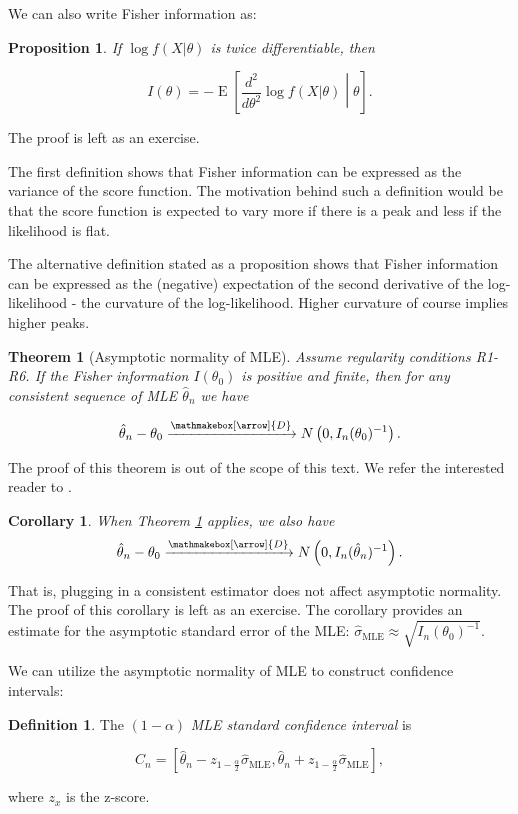 \documentclass{book}
\theoremstyle{plain}%
\newtheorem{theorem}{Theorem}[section]
\newtheorem{corollary}{Corollary}[section]
\newtheorem{proposition}{Proposition}[section]
\theoremstyle{definition}
\newtheorem{definition}{Definition}[section]
\DeclareMathOperator{\E}{E}
\newlength{\arrow}
\newcommand*{\myrightarrow}[1]{\xrightarrow{\mathmakebox[\arrow]{#1}}}
\begin{document}
We can also write Fisher information as:

\begin{proposition}
If $\log f(X|\theta)$ is twice differentiable, then

$$I(\theta) = -\E\left[\frac{d^2}{d \theta^2} \log f(X|\theta)  \middle| \theta \right].$$\label{prop:fi1}
\end{proposition}

The proof is left as an exercise.

The first definition shows that Fisher information can be expressed as the variance of the score function. The motivation behind such a definition would be that the score function is expected to vary more if there is a peak and less if the likelihood is flat.

The alternative definition stated as a proposition shows that Fisher information can be expressed as the (negative) expectation of the second derivative of the log-likelihood - the curvature of the log-likelihood. Higher curvature of course implies higher peaks.

\begin{theorem}[Asymptotic normality of MLE] Assume regularity conditions R1-R6. If the Fisher information $I(\theta_0)$ is positive and finite, then for any consistent sequence of MLE $\hat{\theta}_n$ we have

$$\hat{\theta}_n - \theta_0 \myrightarrow{D} N\left(0, I_n(\theta_0)^{-1}\right).$$\label{thm:normality}
\end{theorem}

The proof of this theorem is out of the scope of this text. We refer the interested reader to \citet[ch. 6.1]{Hogg2005}.

\begin{corollary} When Theorem \ref{thm:normality} applies, we also have
$$\hat{\theta}_n - \theta_0 \myrightarrow{D} N\left(0, I_n(\hat{\theta}_n)^{-1}\right).$$\label{cor:normality}
\end{corollary}

That is, plugging in a consistent estimator does not affect asymptotic normality. The proof of this corollary is left as an exercise. The corollary provides an estimate for the asymptotic standard error of the MLE: $\hat{\sigma}_\text{MLE} \approx \sqrt{I_n(\theta_0)^{-1}}$. 

We can utilize the asymptotic normality of MLE to construct confidence intervals:

\begin{definition} The $(1 - \alpha)$ \emph{MLE standard confidence interval} is 

$$C_n = [\hat{\theta}_n - z_{1 - \frac{\alpha}{2}}\widehat{\sigma}_\text{MLE},\hat{\theta}_n + z_{1 - \frac{\alpha}{2}}\widehat{\sigma}_\text{MLE}],$$

where $z_x$ is the z-score.
\end{definition}
\end{document}
